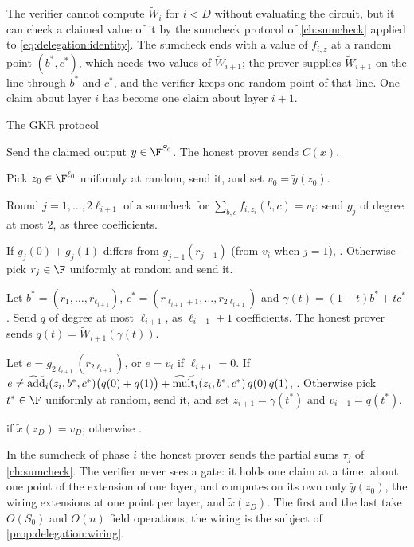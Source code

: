\begin{refsection}
The verifier cannot compute $\tilde W_i$ for $i<D$ without evaluating the circuit, but it can check a claimed value of it by the sumcheck protocol of \cref{ch:sumcheck} applied to \eqref{eq:delegation:identity}. The sumcheck ends with a value of $f_{i,z}$ at a random point $(b^*,c^*)$, which needs two values of $\tilde W_{i+1}$; the prover supplies $\tilde W_{i+1}$ on the line through $b^*$ and $c^*$, and the verifier keeps one random point of that line. One claim about layer $i$ has become one claim about layer $i+1$.

\begin{protocol}{The GKR protocol}\label{prot:delegation:gkr}
\item[\msg{P}{V}] Send the claimed output $y\in\F^{S_0}$. The honest prover sends $C(x)$.
\item[\act{V}] Pick $z_0\in\F^{\ell_0}$ uniformly at random, send it, and set $v_0=\tilde y(z_0)$.
\item[\msg{P}{V}] Round $j=1,\dots,2\ell_{i+1}$ of a sumcheck for $\sum_{b,c}f_{i,z_i}(b,c)=v_i$: send $g_j$ of degree at most $2$, as three coefficients.
\item[\act{V}] If $g_j(0)+g_j(1)$ differs from $g_{j-1}(r_{j-1})$ (from $v_i$ when $j=1$), \rej. Otherwise pick $r_j\in\F$ uniformly at random and send it.
\item[\msg{P}{V}] Let $b^*=(r_1,\dots,r_{\ell_{i+1}})$, $c^*=(r_{\ell_{i+1}+1},\dots,r_{2\ell_{i+1}})$ and $\gamma(t)=(1-t)b^*+tc^*$. Send $q$ of degree at most $\ell_{i+1}$, as $\ell_{i+1}+1$ coefficients. The honest prover sends $q(t)=\tilde W_{i+1}(\gamma(t))$.
\item[\act{V}] Let $e=g_{2\ell_{i+1}}(r_{2\ell_{i+1}})$, or $e=v_i$ if $\ell_{i+1}=0$. If $e\ne\widetilde{\mathrm{add}}_i(z_i,b^*,c^*)\bigl(q(0)+q(1)\bigr)+\widetilde{\mathrm{mult}}_i(z_i,b^*,c^*)\,q(0)\,q(1)$, \rej. Otherwise pick $t^*\in\F$ uniformly at random, send it, and set $z_{i+1}=\gamma(t^*)$ and $v_{i+1}=q(t^*)$.
\item[\act{V}] \acc{} if $\tilde x(z_D)=v_D$; otherwise \rej.
\end{protocol}

In the sumcheck of phase $i$ the honest prover sends the partial sums $\tau_j$ of \cref{ch:sumcheck}. The verifier never sees a gate: it holds one claim at a time, about one point of the extension of one layer, and computes on its own only $\tilde y(z_0)$, the wiring extensions at one point per layer, and $\tilde x(z_D)$. The first and the last take $O(S_0)$ and $O(n)$ field operations; the wiring is the subject of \cref{prop:delegation:wiring}.


\end{refsection}
